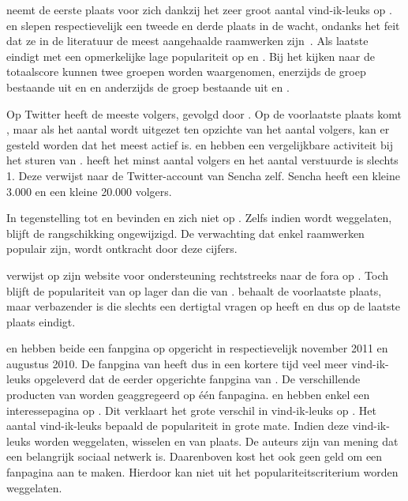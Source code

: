 \kendo{} neemt de eerste plaats voor zich dankzij het zeer groot aantal vind-ik-leuks op \fb.
\jqm{} en \st{} slepen respectievelijk een tweede en derde plaats in de wacht, ondanks het feit dat ze in de literatuur de meest aangehaalde raamwerken zijn~\cite{David2011,Firtman2013,Hales2012,Oeflman2011}. 
Als laatste eindigt \lungo{} met een opmerkelijke lage populariteit op \so{} en \fb.
Bij het kijken naar de totaalscore kunnen twee groepen worden waargenomen, enerzijds de groep bestaande uit \kendo{} en \jqm{} en anderzijds de groep bestaande uit \st{} en \lungo{}.

Op Twitter heeft \jqm{} de meeste volgers, gevolgd door \kendo.
Op de voorlaatste plaats komt \lungo{}, maar als het aantal  wordt uitgezet ten opzichte van het aantal volgers, kan er gesteld worden dat \lungo{} het meest actief is.
\jqm{} en \kendo{} hebben een vergelijkbare activiteit bij het sturen van .
\st{} heeft het minst aantal volgers en het aantal verstuurde  is slechts 1.
Deze  verwijst naar de Twitter-account van Sencha zelf.
Sencha heeft een kleine 3.000  en een kleine 20.000 volgers.

In tegenstelling tot \jqm{} en \lungo{} bevinden \kendo{} en \st{} zich niet op \gh{}.
Zelfs indien \gh{} wordt weggelaten, blijft de rangschikking ongewijzigd.
De verwachting dat enkel  raamwerken populair zijn, wordt ontkracht door deze cijfers.

\kendo{} verwijst op zijn website voor ondersteuning rechtstreeks naar de fora op \so{}. 
Toch blijft de populariteit van \kendo{} op \so{} lager dan die van \jqm{}.
\st{} behaalt de voorlaatste plaats, maar verbazender is \lungo{} die slechts een dertigtal vragen op \so{} heeft en dus op de laatste plaats eindigt.

\kendo{} en \jqm{} hebben beide een fanpgina op \fb{} opgericht in respectievelijk november 2011 en augustus 2010.
De fanpgina van \kendo{} heeft dus in een kortere tijd veel meer vind-ik-leuks opgeleverd dat de eerder opgerichte fanpgina van \jqm{}.
De verschillende producten van \kendo{} worden geaggregeerd op één fanpagina. 
\st{} en \lungo{} hebben enkel een interessepagina op \fb.
Dit verklaart het grote verschil in vind-ik-leuks op \fb.
Het aantal vind-ik-leuks bepaald de populariteit in grote mate.
Indien deze vind-ik-leuks worden weggelaten, wisselen \jqm{} en \kendo{} van plaats.
De auteurs zijn van mening dat \fb{} een belangrijk sociaal netwerk is.
Daarenboven kost het ook geen geld om een fanpagina aan te maken.
Hierdoor kan \fb{} niet uit het populariteitscriterium worden weggelaten.  

